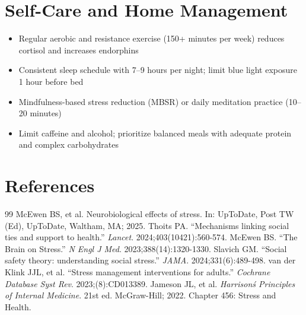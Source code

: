 \section*{Self-Care and Home Management}
\begin{itemize}
  \item Regular aerobic and resistance exercise (150+ minutes per week) reduces cortisol and increases endorphins
  \item Consistent sleep schedule with 7--9 hours per night; limit blue light exposure 1 hour before bed
  \item Mindfulness-based stress reduction (MBSR) or daily meditation practice (10--20 minutes)
  \item Limit caffeine and alcohol; prioritize balanced meals with adequate protein and complex carbohydrates
\end{itemize}

\section*{References}
\begin{thebibliography}{99}
 McEwen BS, et al. Neurobiological effects of stress. In: UpToDate, Post TW (Ed), UpToDate, Waltham, MA; 2025.
 Thoits PA. ``Mechanisms linking social ties and support to health.'' \emph{Lancet}. 2024;403(10421):560-574.
 McEwen BS. ``The Brain on Stress.'' \emph{N Engl J Med}. 2023;388(14):1320-1330.
 Slavich GM. ``Social safety theory: understanding social stress.'' \emph{JAMA}. 2024;331(6):489-498.
 van der Klink JJL, et al. ``Stress management interventions for adults.'' \emph{Cochrane Database Syst Rev}. 2023;(8):CD013389.
 Jameson JL, et al. \emph{Harrison\'s Principles of Internal Medicine}. 21st ed. McGraw-Hill; 2022. Chapter 456: Stress and Health.
\end{thebibliography}
